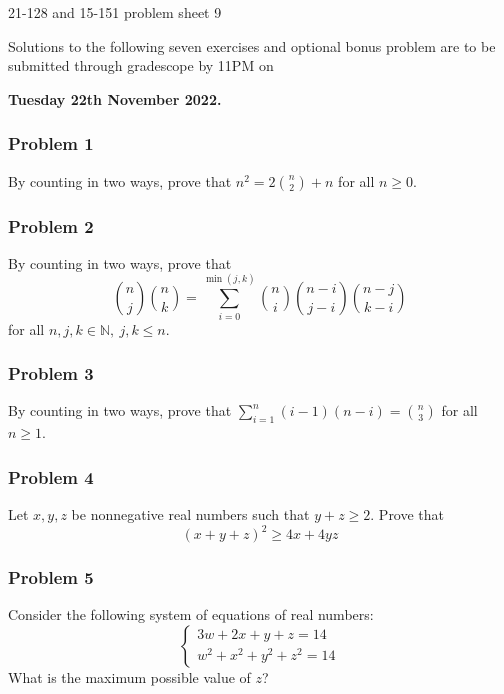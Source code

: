 \newpage\documentclass[11pt,onecolumn,fleqn]{article}
\theoremstyle{definition}
\begin{document}
\thispagestyle{empty}
\begin{center}
{\Huge 21-128 and 15-151 problem sheet 9}

Solutions to the following seven exercises and optional bonus problem are to be submitted through 
gradescope by 11PM on

\textbf{Tuesday 22th November 2022.}

\end{center}


\subsubsection*{Problem 1}
By counting in two ways, prove that $n^2 = 2\binom{n}{2}+n$ for all $n \ge 0$.


\subsubsection*{Problem 2}
By counting in two ways, prove that $${n \choose j}{n \choose k} = \sum_{i = 0}^{\min(j,k)}{n \choose i}{n-i \choose j-i}{n-j \choose k-i}$$ for all $n,j,k \in \mathbb{N},\ j,k \leq n$.


\subsubsection*{Problem 3}
By counting in two ways, prove that $\sum_{i=1}^n (i-1)(n-i) = \binom{n}{3}$ for all $n \ge 1$.


\subsubsection*{Problem 4}
Let $x,y,z$ be nonnegative real numbers such that $y+z \ge 2$. Prove that $$(x+y+z)^2 \ge 4x+4yz$$


\subsubsection*{Problem 5} 
Consider the following system of equations of real numbers:
\begin{equation*}
    \begin{cases}
      3w + 2x + y + z = 14\\
      w^2 + x^2 + y^2 + z^2 = 14
    \end{cases}
\end{equation*}
What is the maximum possible value of $z$?
\end{document}

